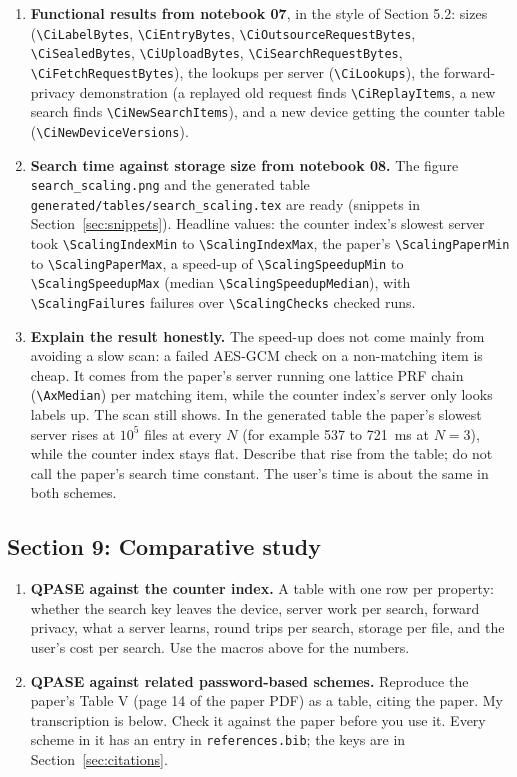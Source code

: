 \documentclass[11pt,a4paper]{article}
\newcommand{\file}[1]{\texttt{#1}}
\begin{document}
\begin{enumerate}
  \item \textbf{Functional results from notebook 07}, in the style of Section 5.2: sizes (\verb|\CiLabelBytes|,
        \verb|\CiEntryBytes|, \verb|\CiOutsourceRequestBytes|, \verb|\CiSealedBytes|, \verb|\CiUploadBytes|,
        \verb|\CiSearchRequestBytes|, \verb|\CiFetchRequestBytes|), the lookups per server (\verb|\CiLookups|),
        the forward-privacy demonstration (a replayed old request finds \verb|\CiReplayItems|, a new search finds
        \verb|\CiNewSearchItems|), and a new device getting the counter table (\verb|\CiNewDeviceVersions|).
  \item \textbf{Search time against storage size from notebook 08.} The figure \file{search\_scaling.png} and the
        generated table \file{generated/tables/search\_scaling.tex} are ready (snippets in Section~\ref{sec:snippets}).
        Headline values: the counter index's slowest server took \verb|\ScalingIndexMin| to
        \verb|\ScalingIndexMax|, the paper's \verb|\ScalingPaperMin| to \verb|\ScalingPaperMax|, a speed-up of
        \verb|\ScalingSpeedupMin| to \verb|\ScalingSpeedupMax| (median \verb|\ScalingSpeedupMedian|), with
        \verb|\ScalingFailures| failures over \verb|\ScalingChecks| checked runs.
  \item \textbf{Explain the result honestly.} The speed-up does not come mainly from avoiding a slow scan: a
        failed AES-GCM check on a non-matching item is cheap. It comes from the paper's server running one lattice
        PRF chain (\verb|\AxMedian|) per matching item, while the counter index's server only looks labels up.
        The scan still shows. In the generated table the paper's slowest server rises at $10^5$ files at every
        $N$ (for example 537 to 721~ms at $N = 3$), while the counter index stays flat. Describe that rise from the
        table; do not call the paper's search time constant. The user's time is about the same in both schemes.
\end{enumerate}

\subsection{Section 9: Comparative study}

\begin{enumerate}
  \item \textbf{QPASE against the counter index.} A table with one row per property: whether the search key
        leaves the device, server work per search, forward privacy, what a server learns, round trips per search,
        storage per file, and the user's cost per search. Use the macros above for the numbers.
  \item \textbf{QPASE against related password-based schemes.} Reproduce the paper's Table V (page 14 of the
        paper PDF) as a table, citing the paper. My transcription is below. Check it against the paper before you
        use it. Every scheme in it has an entry in \file{references.bib}; the keys are in Section~\ref{sec:citations}.
\end{enumerate}
\end{document}
